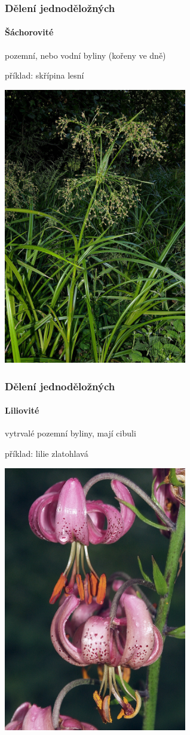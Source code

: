 \documentclass{beamer}
\begin{document}
\begin{frame}
\frametitle{Dělení jednoděložných}
\framesubtitle{Šáchorovité}
pozemní, nebo vodní byliny (kořeny ve dně)

příklad: skřípina lesní %

\begin{center}\includegraphics[width=8cm]{800px-ScirpusSylvaticus.jpg}\end{center}

\end{frame}
\begin{frame}
\frametitle{Dělení jednoděložných}
\framesubtitle{Liliovité}
vytrvalé pozemní byliny, mají cibuli

příklad: lilie zlatohlavá

\begin{center}\includegraphics[width=8cm]{Lilium_martagon_250605a.jpg}\end{center}

\end{frame}
\end{document}
